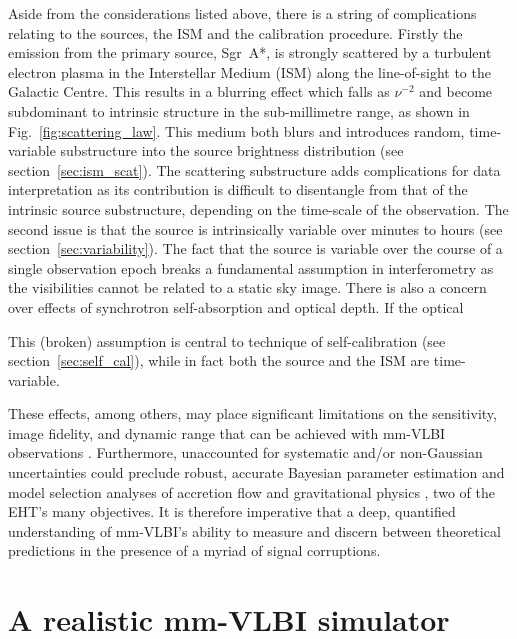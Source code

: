 {%
Aside from the considerations listed above, there is a string of complications relating to the sources, the ISM and the calibration procedure. 
Firstly the emission from the primary source, Sgr~A*, is strongly scattered by a turbulent electron plasma in the Interstellar Medium (ISM) along the line-of-sight to the Galactic Centre. This results in a blurring effect \citep[e.g.][]{Fish_2014} which falls as $\nu^{-2}$ and become subdominant to intrinsic structure in the sub-millimetre range, as shown in Fig.~\ref{fig:scattering_law}. This medium both blurs and introduces random, time-variable substructure into the source brightness distribution (see section~\ref{sec:ism_scat}). The scattering substructure adds complications for data interpretation as its contribution is difficult to disentangle from that of the intrinsic source substructure, depending on the time-scale of the observation.
The second issue is that the source is intrinsically variable over minutes to hours (see section~\ref{sec:variability}). The fact that the source is variable over the course of a single observation epoch breaks a fundamental assumption in interferometry as the visibilities cannot be related to a static sky image. There is also a concern over effects of synchrotron self-absorption and optical depth. If the optical

This (broken) assumption is central to technique of self-calibration (see section~\ref{sec:self_cal}), while in fact both the source and the ISM are time-variable.


These effects, among others, may place significant limitations on the sensitivity, image fidelity, and dynamic range that can be achieved with mm-VLBI observations \citep{Blecher_2016}.  Furthermore, unaccounted for systematic and/or non-Gaussian uncertainties could preclude robust, accurate Bayesian parameter estimation and model selection analyses of accretion flow \citep[e.g.][]{Broderick_2016} and gravitational physics \citep[e.g.][]{Broderick_2014, Psaltis_2016}, two of the EHT's many objectives. It is therefore imperative that a deep, quantified understanding of mm-VLBI's ability to measure and discern between theoretical predictions in the presence of a myriad of signal corruptions.


\section{A realistic mm-VLBI simulator}

}
